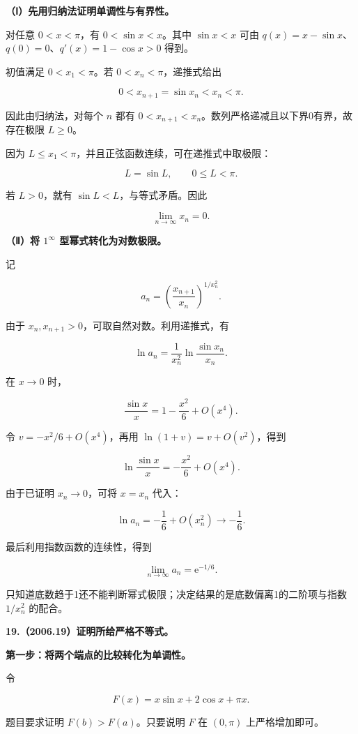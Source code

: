 \documentclass[UTF8,11pt,fontset=windows]{ctexart}
\begin{document}
\textbf{（Ⅰ）先用归纳法证明单调性与有界性。}

对任意 $0<x<\pi$，有 $0<\sin x<x$。其中 $\sin x<x$ 可由 $q(x)=x-\sin x$、$q(0)=0$、$q'(x)=1-\cos x>0$ 得到。

初值满足 $0<x_1<\pi$。若 $0<x_n<\pi$，递推式给出

$$
0<x_{n+1}=\sin x_n<x_n<\pi.
$$

因此由归纳法，对每个 $n$ 都有 $0<x_{n+1}<x_n$。数列严格递减且以下界0有界，故存在极限 $L\ge0$。

因为 $L\le x_1<\pi$，并且正弦函数连续，可在递推式中取极限：

$$
L=\sin L,\qquad0\le L<\pi.
$$

若 $L>0$，就有 $\sin L<L$，与等式矛盾。因此

$$
\boxed{\lim_{n\to\infty}x_n=0.}
$$

\textbf{（Ⅱ）将 $1^\infty$ 型幂式转化为对数极限。}

记

$$
a_n=\left(\frac{x_{n+1}}{x_n}\right)^{1/x_n^2}.
$$

由于 $x_n,x_{n+1}>0$，可取自然对数。利用递推式，有

$$
\ln a_n=\frac1{x_n^2}\ln\frac{\sin x_n}{x_n}.
$$

在 $x\to0$ 时，

$$
\frac{\sin x}{x}=1-\frac{x^2}{6}+O(x^4).
$$

令 $v=-x^2/6+O(x^4)$，再用 $\ln(1+v)=v+O(v^2)$，得到

$$
\ln\frac{\sin x}{x}=-\frac{x^2}{6}+O(x^4).
$$

由于已证明 $x_n\to0$，可将 $x=x_n$ 代入：

$$
\ln a_n=-\frac16+O(x_n^2)\longrightarrow-\frac16.
$$

最后利用指数函数的连续性，得到

$$
\boxed{\lim_{n\to\infty}a_n=\mathrm e^{-1/6}.}
$$

只知道底数趋于1还不能判断幂式极限；决定结果的是底数偏离1的二阶项与指数 $1/x_n^2$ 的配合。

\clearpage

\textbf{19.（2006.19）证明所给严格不等式。}

\textbf{第一步：将两个端点的比较转化为单调性。}

令

$$
F(x)=x\sin x+2\cos x+\pi x.
$$

题目要求证明 $F(b)>F(a)$。只要说明 $F$ 在 $(0,\pi)$ 上严格增加即可。
\end{document}
